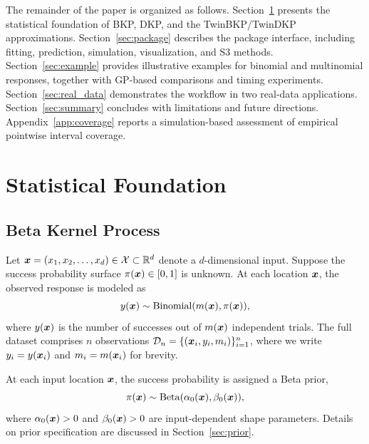 \documentclass[article, shortnames]{jss}
\renewcommand{\vec}[1]{\mbox{\boldmath ${#1}$}}
\begin{document}
The remainder of the paper is organized as follows. 
Section~\ref{sec:model} presents the statistical foundation of BKP, DKP, and the TwinBKP/TwinDKP approximations. 
Section~\ref{sec:package} describes the package interface, including fitting, prediction, simulation, visualization, and S3 methods. 
Section~\ref{sec:example} provides illustrative examples for binomial and multinomial responses, together with GP-based comparisons and timing experiments. 
Section~\ref{sec:real_data} demonstrates the workflow in two real-data applications. 
Section~\ref{sec:summary} concludes with limitations and future directions.
Appendix~\ref{app:coverage} reports a simulation-based assessment of empirical pointwise interval coverage.

\section{Statistical Foundation} \label{sec:model}
 
\subsection{Beta Kernel Process}\label{sec:review-bkp}

Let $\vec{x} = (x_1, x_2, \ldots, x_d) \in \mathcal{X} \subset \mathbb{R}^d$ denote a $d$-dimensional input. Suppose the success probability surface $\pi(\vec{x}) \in [0,1]$ is unknown. 
At each location $\vec{x}$, the observed response is modeled as
\[
	y(\vec{x}) \sim \mathrm{Binomial}(m(\vec{x}), \pi(\vec{x})),
\]
where $y(\vec{x})$ is the number of successes out of $m(\vec{x})$ independent trials. 
The full dataset comprises $n$ observations $\mathcal{D}_n = \{(\vec{x}_i, y_i, m_i)\}_{i=1}^n$, where we write $y_i= y(\vec{x}_i)$ and $m_i= m(\vec{x}_i)$ for brevity.

At each input location $\vec{x}$, the success probability is assigned a Beta prior,
\[
	\pi(\vec{x}) \sim \mathrm{Beta}(\alpha_0(\vec{x}), \beta_0(\vec{x})),
\]
where $\alpha_0(\vec{x}) > 0$ and $\beta_0(\vec{x}) > 0$ are input-dependent shape parameters. Details on prior specification are discussed in Section~\ref{sec:prior}.
\end{document}

